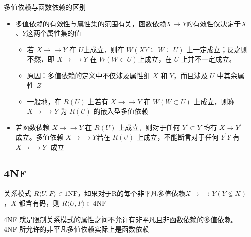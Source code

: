 多值依赖与函数依赖的区别
\begin{itemize}
    \item 多值依赖的有效性与属性集的范围有关，函数依赖$X\to Y$的有效性仅决定于$X$、$Y$这两个属性集的值
    \begin{itemize}
        \item 若 $X\to\to Y$ 在 $U$上成立，则在 $W(XY \subseteq W \subseteq U)$ 上一定成立；反之则不然，即 $X\to\to Y$ 在 $W(W\subset U)$上成立，在 $U$ 上并不一定成立。
        \item 原因：多值依赖的定义中不仅涉及属性组 $X$ 和 $Y$，而且涉及 $U$ 中其余属性 $Z$  
        \item 一般地，在 $R(U)$ 上若有 $X\to\to Y$ 在 $W(W\subset U)$ 上成立，则称 $X\to\to Y$ 为 $R(U)$ 的嵌入型多值依赖
    \end{itemize}
    \item 若函数依赖 $X\to\to Y$ 在 $R(U)$ 上成立，则对于任何 $Y^\prime \subset Y$ 均有 $X\to Y^\prime$ 成立。多值依赖 $X\to\to Y$若在 $R(U)$ 上成立，不能断言对于任何 $Y^\prime Y$ 有 $X\to \to Y^\prime$ 成立
\end{itemize}

\subsection{4NF}
关系模式 $R\langle U,F\rangle \in 1\mathrm{NF}$，如果对于R的每个非平凡多值依赖$X\to \to Y(Y \not \subseteq X)$，$X$ 都含有码，则 $R\langle U,F\rangle \in 4\mathrm{NF}$

4NF 就是限制关系模式的属性之间不允许有非平凡且非函数依赖的多值依赖。4NF 所允许的非平凡多值依赖实际上是函数依赖